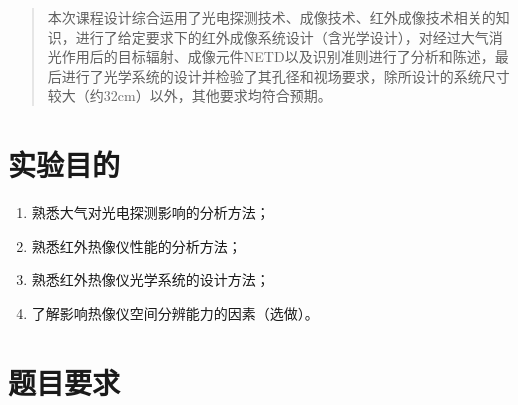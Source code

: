 \documentclass[11pt]{article}
\begin{document}
\newpage
\begin{abstract}


  本次课程设计综合运用了光电探测技术、成像技术、红外成像技术相关的知识，进行了给定要求下的红外成像系统设计（含光学设计），对经过大气消光作用后的目标辐射、成像元件NETD以及识别准则进行了分析和陈述，最后进行了光学系统的设计并检验了其孔径和视场要求，除所设计的系统尺寸较大（约32cm）以外，其他要求均符合预期。
\end{abstract}

\newpage
\setcounter{tocdepth}{3}
\tableofcontents




\newpage

\setcounter{page}{1}
\section{实验目的}
\begin{enumerate}
  \item 熟悉大气对光电探测影响的分析方法；
  \item 熟悉红外热像仪性能的分析方法；
  \item 熟悉红外热像仪光学系统的设计方法；
  \item 了解影响热像仪空间分辨能力的因素（选做）。
\end{enumerate}

\section{题目要求}
\end{document}
